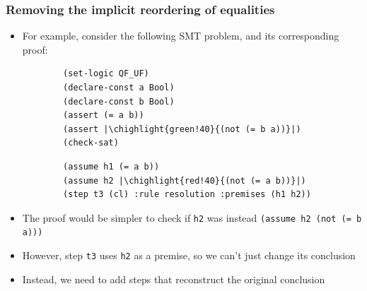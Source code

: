 \documentclass[usepdftitle=false,aspectratio=169]{beamer}
\newcommand\vitem{\vfill\item}
\newcommand\chighlight[2]{\setlength{\fboxsep}{0pt}\colorbox{#1}{#2\strut}}
\begin{document}
\begin{frame}[fragile]
  \frametitle{Removing the implicit reordering of equalities}
  \begin{itemize}
    \item For example, consider the following SMT problem, and its corresponding
    proof:
    \begin{minipage}[t]{0.35 \textwidth}
      \begin{verbatim}
        (set-logic QF_UF)
        (declare-const a Bool)
        (declare-const b Bool)
        (assert (= a b))
        (assert |\chighlight{green!40}{(not (= b a))}|)
        (check-sat)
      \end{verbatim}
    \end{minipage}
    \hfill
    \begin{minipage}[t]{0.6 \textwidth}
      \begin{verbatim}
        (assume h1 (= a b))
        (assume h2 |\chighlight{red!40}{(not (= a b))}|)
        (step t3 (cl) :rule resolution :premises (h1 h2))
      \end{verbatim}
    \end{minipage}
    \vitem The proof would be simpler to check if \texttt{h2} was instead
    \texttt{(assume h2 (not (= b a)))}
    \vitem However, step \texttt{t3} uses \texttt{h2} as a premise, so we can't
    just change its conclusion
    \vitem Instead, we need to add steps that reconstruct the original
    conclusion
  \end{itemize}
\end{frame}
\end{document}
